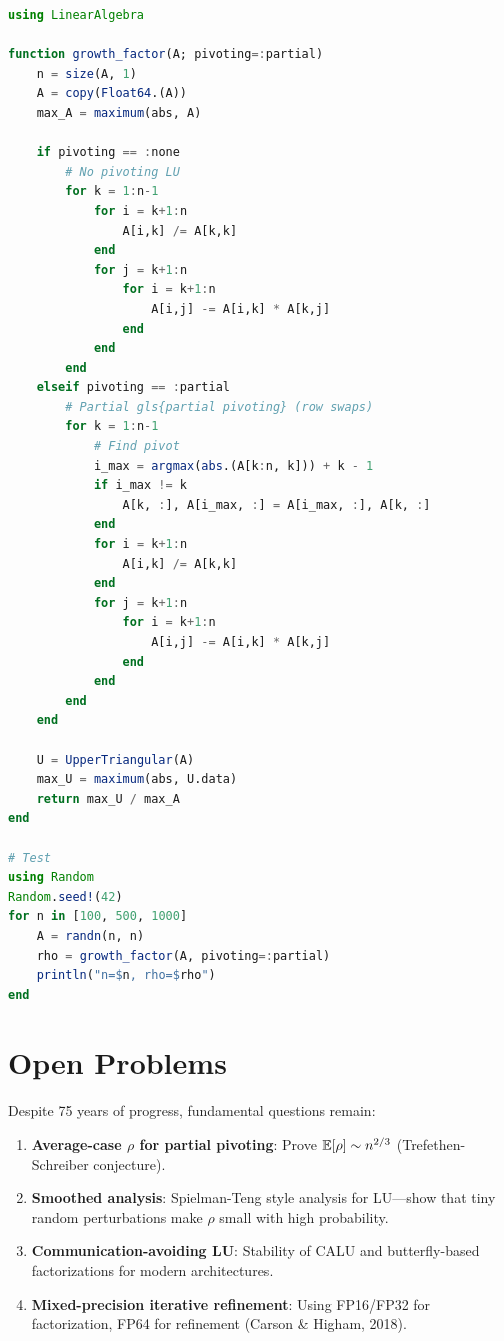 \begin{lstlisting}[language=Julia,caption=Growth factor computation]
using LinearAlgebra

function growth_factor(A; pivoting=:partial)
    n = size(A, 1)
    A = copy(Float64.(A))
    max_A = maximum(abs, A)
    
    if pivoting == :none
        # No pivoting LU
        for k = 1:n-1
            for i = k+1:n
                A[i,k] /= A[k,k]
            end
            for j = k+1:n
                for i = k+1:n
                    A[i,j] -= A[i,k] * A[k,j]
                end
            end
        end
    elseif pivoting == :partial
        # Partial gls{partial pivoting} (row swaps)
        for k = 1:n-1
            # Find pivot
            i_max = argmax(abs.(A[k:n, k])) + k - 1
            if i_max != k
                A[k, :], A[i_max, :] = A[i_max, :], A[k, :]
            end
            for i = k+1:n
                A[i,k] /= A[k,k]
            end
            for j = k+1:n
                for i = k+1:n
                    A[i,j] -= A[i,k] * A[k,j]
                end
            end
        end
    end
    
    U = UpperTriangular(A)
    max_U = maximum(abs, U.data)
    return max_U / max_A
end

# Test
using Random
Random.seed!(42)
for n in [100, 500, 1000]
    A = randn(n, n)
    rho = growth_factor(A, pivoting=:partial)
    println("n=$n, rho=$rho")
end
\end{lstlisting}

\section{Open Problems}
\label{sec:ge:open}

Despite 75 years of progress, fundamental questions remain:

\begin{enumerate}
    \item \textbf{Average-case $\rho$ for partial pivoting}: Prove $\mathbb{E}[\rho] \sim n^{2/3}$ (Trefethen-Schreiber conjecture).
    \item \textbf{Smoothed analysis}: Spielman-Teng style analysis for LU---show that tiny random perturbations make $\rho$ small with high probability.
    \item \textbf{Communication-avoiding LU}: Stability of CALU and butterfly-based factorizations for modern architectures.
    \item \textbf{Mixed-precision iterative refinement}: Using FP16/FP32 for factorization, FP64 for refinement (Carson \& Higham, 2018).
\end{enumerate}

